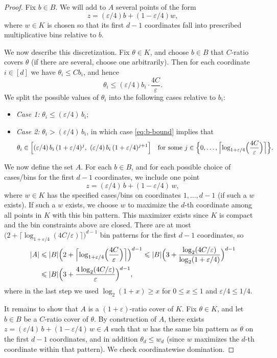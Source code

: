 \documentclass[11pt]{article}
\renewcommand{\le}{\leqslant}
\renewcommand{\ge}{\geqslant}
\newcommand{\eps}{\varepsilon}
\theoremstyle{definition}
\theoremstyle{remark}
\begin{document}
\begin{proof}
Fix $b\in B$. We will add to $A$ several points of the form
\[
z  = (\eps/4)b + (1-\eps/4)w,
\]
where $w\in K$ is chosen so that its first $d-1$ coordinates fall into prescribed multiplicative bins relative to $b$.

We now describe this discretization. Fix $\theta\in K$, and choose $b\in B$ that $C$-ratio covers $\theta$ (if there are several, choose one arbitrarily).
Then for each coordinate $i\in[d]$ we have $\theta_i \le C b_i$, and hence
\begin{equation}
\label{eq:b-bound}
\theta_i \le (\eps/4)b_i \cdot \frac{4C}{\eps}.
\end{equation}
We split the possible values of $\theta_i$ into the following cases relative to $b_i$:
\begin{itemize}[leftmargin=2em]
\item \emph{Case 1:} $\theta_i \le (\eps/4)\,b_i$;
\item \emph{Case 2:} $\theta_i > (\eps/4)\,b_i$, in which case \eqref{eq:b-bound} implies that
\[
\theta_i \in \Bigl[(\eps/4)\,b_i\,(1+\eps/4)^j,\ (\eps/4)\,b_i\,(1+\eps/4)^{j+1}\Bigr]
\quad\text{for some } j \in \Bigl\{0,\dots,\Bigl\lceil \log_{1+\eps/4}\Bigl(\frac{4C}{\eps}\Bigr)\Bigr\rceil\Bigr\}.
\]
\end{itemize}

We now define the set $A$.
For each $b\in B$, and for each possible choice of cases/bins for the first $d-1$ coordinates, we include one point
\[
z = (\eps/4)\,b + (1-\eps/4)\,w,
\]
where $w\in K$ has the specified cases/bins on coordinates $1,\dots,d-1$ (if such a $w$ exists).
If such a $w$ exists, we choose $w$ to maximize the $d$-th coordinate among all points in $K$ with this bin pattern.
This maximizer exists since $K$ is compact and the bin constraints above are closed.
There are at most $\bigl(2+\lceil \log_{1+\eps/4}(4C/\eps)\rceil\bigr)^{d-1}$ bin patterns for the first $d-1$ coordinates, so
\begin{align*}
|A|
&\le |B|\Bigl(2+\Bigl\lceil \log_{1+\eps/4}\Bigl(\frac{4C}{\eps}\Bigr)\Bigr\rceil\Bigr)^{d-1}
\le |B|\Bigl(3+\frac{\log_2(4C/\eps)}{\log_2(1+\eps/4)}\Bigr)^{d-1}\\
&\le |B|\Bigl(3+\frac{4\log_2(4C/\eps)}{\eps}\Bigr)^{d-1},
\end{align*}
where in the last step we used $\log_2(1+x)\ge x$ for $0\le x\le 1$ and $\eps/4\le 1/4$.

It remains to show that $A$ is a $(1+\eps)$-ratio cover of $K$.
Fix $\theta\in K$, and let $b\in B$ be a $C$-ratio cover of $\theta$.
By construction of $A$, there exists $z=(\eps/4)\,b+(1-\eps/4)\,w\in A$ such that $w$ has the same bin pattern as $\theta$ on the first $d-1$ coordinates, and in addition $\theta_d \le w_d$ (since $w$ maximizes the $d$-th coordinate within that pattern).
We check coordinatewise domination.


\end{proof}
\end{document}
